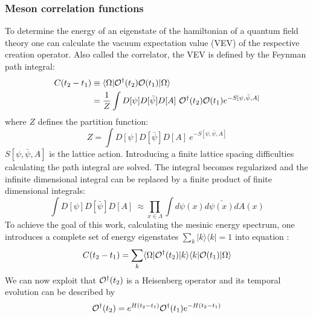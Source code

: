     \subsubsection{Meson correlation functions}
        To determine the energy of an eigenstate of the hamiltonian of a quantum field theory one can calculate the vacuum expectation value (VEV) of the respective creation operator. Also called the correlator, the VEV is defined by the Feynman path integral:
        \begin{equation}\label{VEV}
            \begin{aligned}
                C(t_2 - t_1) &\equiv \langle\Omega|\Operator^\dagger(t_2)\Operator(t_1)|\Omega\rangle \\
                &= \frac{1}{Z}\int D[\psi]D[\bar{\psi}]D[A]\ \Operator^\dagger(t_2)\Operator(t_1)e^{-S[\psi, \bar{\psi}, A]}
            \end{aligned}
        \end{equation}
        where $Z$ defines the partition function:
        \begin{equation}\label{partition_function}
            Z = \int D[\psi]D[\bar{\psi}]D[A]\ e^{-S[\psi, \bar{\psi}, A]}
        \end{equation}
        $S[\psi, \bar{\psi}, A]$ is the lattice action. Introducing a finite lattice spacing difficulties calculating the path integral are solved. The integral becomes regularized and the infinite dimensional integral can be replaced by a finite product of finite dimensional integrals:
        \begin{equation}
            \int D[\psi]D[\bar{\psi}]D[A]\ \approx \prod_{x \in \Lambda}\int d\psi(x)d\bar{\psi(x)}dA(x)
        \end{equation}
        To achieve the goal of this work, calculating the mesinic energy spectrum, one introduces a complete set of energy eigenstates $\sum_k |k\rangle\langle k| = 1$ into equation :
        \begin{equation}\label{correlation_with_eigenstates}
            C(t_2 - t_1) = \sum_k \langle\Omega|\mathcal{O}^\dagger(t_2) |k\rangle\langle k| \mathcal{O}(t_1)|\Omega\rangle
        \end{equation}
        We can now exploit that $\mathcal{O}^\dagger(t_2)$ is a Heisenberg operator and its temporal evolution can be described by
        \begin{equation}
            \mathcal{O}^\dagger(t_2) = e^{H(t_2 - t_1)}\mathcal{O}^\dagger(t_1)e^{-H(t_2 - t_1)}
        \end{equation}
